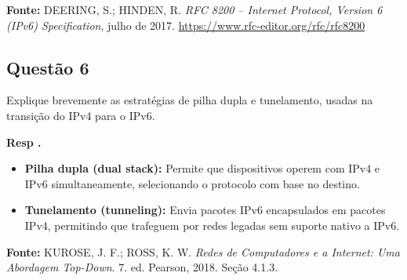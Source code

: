 \textbf{Fonte:} DEERING, S.; HINDEN, R. \textit{RFC 8200 – Internet Protocol, Version 6 (IPv6) Specification}, julho de 2017. \url{https://www.rfc-editor.org/rfc/rfc8200}
\newline

\subsection{Questão 6}
Explique brevemente as estratégias de pilha dupla e tunelamento,
usadas na transição do IPv4 para o IPv6.
\newline

\textbf{Resp .}
\begin{itemize}
\item \textbf{Pilha dupla (dual stack):} Permite que dispositivos operem com IPv4 e IPv6 simultaneamente, selecionando o protocolo com base no destino.

\item \textbf{Tunelamento (tunneling):} Envia pacotes IPv6 encapsulados em pacotes IPv4, permitindo que trafeguem por redes legadas sem suporte nativo a IPv6.

\end{itemize}

\textbf{Fonte:} KUROSE, J. F.; ROSS, K. W. \textit{Redes de Computadores e a Internet: Uma Abordagem Top-Down}. 7. ed. Pearson, 2018. Seção 4.1.3.
